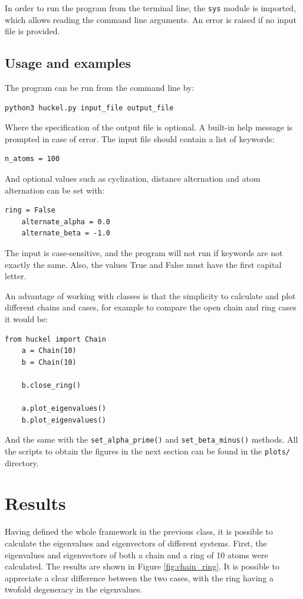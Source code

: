 \documentclass{article}
\begin{document}
In order to run the program from the terminal line, the \texttt{sys} module is imported, which allows reading the command line arguments. An error is raised if no input file is provided. 

\subsection{Usage and examples}
The program can be run from the command line by:
\begin{lstlisting}[backgroundcolor=\color{LightGray}]
    python3 huckel.py input_file output_file
\end{lstlisting} 
Where the specification of the output file is optional. A built-in help message is prompted in case of error. The input file should contain a list of keywords:

\begin{lstlisting}[backgroundcolor=\color{LightGray}]
    n_atoms = 100
\end{lstlisting} 
And optional values such as cyclization, distance alternation and atom alternation can be set with:
\begin{lstlisting}[backgroundcolor=\color{LightGray}]
    ring = False
    alternate_alpha = 0.0
    alternate_beta = -1.0
\end{lstlisting} 
The input is case-sensitive, and the program will not run if keywords are not exactly the same. Also, the values True and False must have the first capital letter.

An advantage of working with classes is that the simplicity to calculate and plot different chains and cases, for example to compare the open chain and ring cases it would be:
\begin{lstlisting}[backgroundcolor=\color{LightGray}]
    from huckel import Chain
    a = Chain(10)
    b = Chain(10)
    
    b.close_ring()
    
    a.plot_eigenvalues()
    b.plot_eigenvalues()
\end{lstlisting} 
And the same with the  \texttt{set\_alpha\_prime()} and \texttt{set\_beta\_minus()} methods. All the scripts to obtain the figures in the next section can be found in the \texttt{plots/} directory. 

\section{Results}
Having defined the whole framework in the previous class, it is possible to calculate the eigenvalues and eigenvectors of different systems. First, the eigenvalues and eigenvectors of both a chain and a ring of 10 atoms were calculated. The results are shown in Figure \ref{fig:chain_ring}. It is possible to appreciate a clear difference between the two cases, with the ring having a twofold degeneracy in the eigenvalues.
\end{document}
